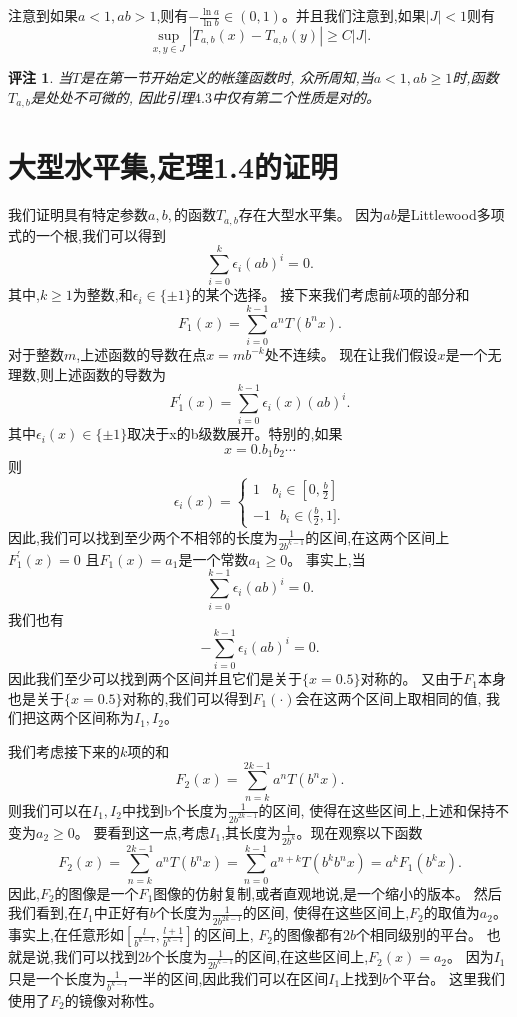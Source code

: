 \documentclass[12pt,a4paper]{article}
\newtheorem{remark}[theorem]{评注}
\begin{document}
       注意到如果$a<1,ab>1$,则有$-\frac{\ln a}{\ln b}\in(0,1)$。并且我们注意到,如果$|J|<1$则有
       $$
            \underset{x,y\in J}{\sup}|T_{a,b}(x)-T_{a,b}(y)|\ge C|J|.
       $$

       \begin{remark}
            当$T$是在第一节开始定义的帐篷函数时,
            众所周知,当$a<1,ab\ge1$时,函数$T_{a,b}$是处处不可微的,
            因此引理$4.3$中仅有第二个性质是对的。
       \end{remark}

       \section{大型水平集,定理1.4的证明}

       我们证明具有特定参数$a,b,$的函数$T_{a,b}$存在大型水平集。
       因为$ab$是Littlewood多项式的一个根,我们可以得到
       $$
            \sum_{i=0}^k\epsilon_i(ab)^i=0.
       $$
       其中,$k\ge1$为整数,和$\epsilon_i\in\{\pm1\}$的某个选择。
        接下来我们考虑前$k$项的部分和
        $$
            F_1(x)=\sum_{i=0}^{k-1}a^nT(b^nx).
        $$
       对于整数$m$,上述函数的导数在点$x=mb^{-k}$处不连续。
       现在让我们假设$x$是一个无理数,则上述函数的导数为
       $$
            F_1^\prime(x)=\sum_{i=0}^{k-1}\epsilon_i(x)(ab)^i.
       $$
       其中$\epsilon_i(x)\in\{\pm1\}$取决于x的b级数展开。特别的,如果
       $$
            x=0.b_1b_2\cdots
       $$
       则
       $$
            \epsilon_i(x)=\begin{cases}1~~~~b_i\in[0,\frac{b}{2}]\\-1~~~b_i\in(\frac{b}{2},1].\end{cases}
       $$
       因此,我们可以找到至少两个不相邻的长度为$\frac{1}{2b^{k-1}}$的区间,在这两个区间上$F_1^\prime(x)=0$
       且$F_1(x)=a_1$是一个常数$a_1\ge0$。
       事实上,当
       $$
            \sum_{i=0}^{k-1}\epsilon_i(ab)^i=0.
       $$
       我们也有
       $$
            -\sum_{i=0}^{k-1}\epsilon_i(ab)^i=0.
       $$
       因此我们至少可以找到两个区间并且它们是关于$\{x=0.5\}$对称的。
       又由于$F_1$本身也是关于$\{x=0.5\}$对称的,我们可以得到$F_1(\cdot)$会在这两个区间上取相同的值,
       我们把这两个区间称为$I_1,I_2$。

       我们考虑接下来的$k$项的和
       $$
            F_2(x)=\sum_{n=k}^{2k-1}a^nT(b^nx).
       $$
       则我们可以在$I_1,I_2$中找到b个长度为$\frac{1}{2b^{2k-1}}$的区间,
       使得在这些区间上,上述和保持不变为$a_2\ge0$。
       要看到这一点,考虑$I_1$,其长度为$\frac{1}{2b^k}$。现在观察以下函数
       $$
            F_2(x)=\sum_{n=k}^{2k-1}a^nT(b^nx)=\sum_{n=0}^{k-1}a^{n+k}T(b^kb^nx)=a^kF_1(b^kx).
       $$
       因此,$F_2$的图像是一个$F_1$图像的仿射复制,或者直观地说,是一个缩小的版本。
       然后我们看到,在$I_1$中正好有$b$个长度为$\frac{1}{2b^{2k-1}}$的区间,
       使得在这些区间上,$F_2$的取值为$a_2$。
       事实上,在任意形如$[\frac{l}{b^{k-1}},\frac{l+1}{b^{k-1}}]$的区间上,
       $F_2$的图像都有$2b$个相同级别的平台。
       也就是说,我们可以找到$2b$个长度为$\frac{1}{2b^{k-1}}$的区间,在这些区间上,$F_2(x)=a_2$。
       因为$I_1$只是一个长度为$\frac{1}{b^{k-1}}$一半的区间,因此我们可以在区间$I_1$上找到$b$个平台。
       这里我们使用了$F_2$的镜像对称性。
\end{document}
